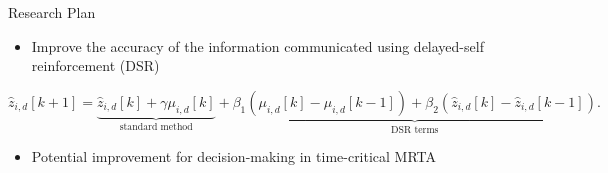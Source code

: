 \begin{frame}{Research Plan}
    \begin{itemize}
        \item Improve the accuracy of the information communicated using delayed-self reinforcement (DSR)~\cite{devasia2020cohesive}
    \end{itemize}
    \begin{equation*}
        \label{dsr method}
        \hat{z}_{i,d}[k+1] =  \underbrace{\hat{z}_{i,d}[k] + \gamma \mu_{i,d}[k]}_{\text{standard method}} + \underbrace{\beta_1 \left(\mu_{i,d}[k] - \mu_{i,d}[k-1]\right) + \beta_2 \left(\hat{z}_{i,d}[k] - \hat{z}_{i,d}[k-1]\right)}_{\text{DSR terms}}.
    \end{equation*}
    \vspace{-0.6cm}
    \begin{figure}[H] 
    \centering
    \hfill
  \label{Fig_sims} 
\end{figure}
\begin{itemize}
    \item Potential improvement for decision-making in time-critical MRTA
\end{itemize}
\end{frame}

